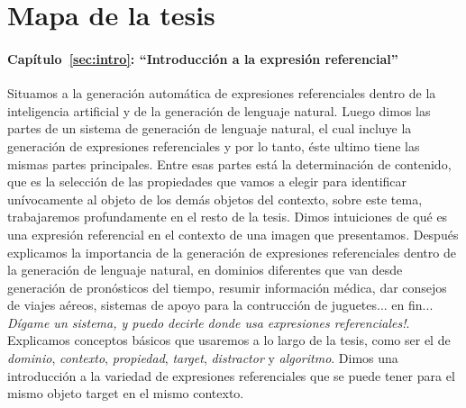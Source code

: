 \section{Mapa de la tesis}
\label{sec:mapadetesis}
\paragraph{Cap\'itulo~\ref{sec:intro}: ``Introducci\'on a la expresi\'on referencial''} Situamos a la generaci\'on autom\'atica de expresiones 
referenciales dentro de la inteligencia artificial y de la generaci\'on de lenguaje natural. Luego dimos las partes de un sistema de 
generaci\'on de lenguaje natural, el cual incluye la generaci\'on de expresiones referenciales y por lo tanto, \'este ultimo tiene las mismas 
partes principales. Entre esas partes est\'a la determinaci\'on de contenido, que es la selecci\'on de las propiedades que vamos a elegir 
para identificar un\'ivocamente al objeto de los dem\'as objetos del contexto, sobre este tema, trabajaremos profundamente en el resto de la 
tesis. Dimos intuiciones de qu\'e es una expresi\'on referencial en el contexto de una imagen que presentamos. Despu\'es explicamos la 
importancia de la generaci\'on de expresiones referenciales dentro de la generaci\'on de lenguaje natural, en 
dominios diferentes que van desde generaci\'on de pron\'osticos del tiempo, resumir informaci\'on m\'edica, dar consejos de viajes a\'ereos, 
sistemas de apoyo para la contrucci\'on de juguetes... en fin... {\it D\'igame un sistema, y puedo decirle donde usa expresiones 
referenciales!}. Explicamos conceptos b\'asicos que usaremos a lo largo de la tesis, como ser el de {\it dominio}, {\it contexto}, 
{\it propiedad}, {\it target}, {\it distractor} y {\it algoritmo}. Dimos una introducci\'on a la variedad de expresiones referenciales que 
se puede tener para el mismo objeto target en el mismo contexto.

